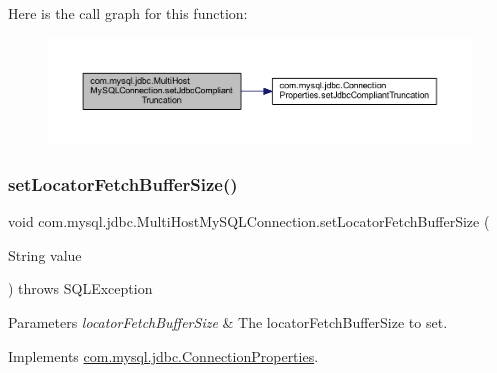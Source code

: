 Here is the call graph for this function\+:
\nopagebreak
\begin{figure}[H]
\begin{center}
\leavevmode
\includegraphics[width=350pt]{classcom_1_1mysql_1_1jdbc_1_1_multi_host_my_s_q_l_connection_a21f38ef972c4b59de2b93cdc7549d634_cgraph}
\end{center}
\end{figure}
\mbox{\label{classcom_1_1mysql_1_1jdbc_1_1_multi_host_my_s_q_l_connection_a2c06dae5dc39a0e78d8f40f916376021}} 
\subsubsection{\texorpdfstring{set\+Locator\+Fetch\+Buffer\+Size()}{setLocatorFetchBufferSize()}}
{\footnotesize\ttfamily void com.\+mysql.\+jdbc.\+Multi\+Host\+My\+S\+Q\+L\+Connection.\+set\+Locator\+Fetch\+Buffer\+Size (\begin{DoxyParamCaption}\item[{String}]{value }\end{DoxyParamCaption}) throws S\+Q\+L\+Exception}


\begin{DoxyParams}{Parameters}
{\em locator\+Fetch\+Buffer\+Size} & The locator\+Fetch\+Buffer\+Size to set. \\
\hline
\end{DoxyParams}


Implements \mbox{\hyperlink{interfacecom_1_1mysql_1_1jdbc_1_1_connection_properties_ae7d48146159a39b7171b4b5a074466c1}{com.\+mysql.\+jdbc.\+Connection\+Properties}}.

